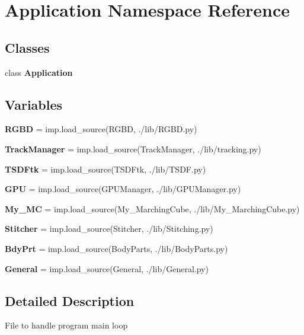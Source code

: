 \section{Application Namespace Reference}
\label{namespace_application}
\subsection*{Classes}
\begin{DoxyCompactItemize}
\item 
class \textbf{ Application}
\end{DoxyCompactItemize}
\subsection*{Variables}
\begin{DoxyCompactItemize}
\item 
\mbox{\label{namespace_application_a2fbdda0410c38b56264f744c6908835f}} 
{\bfseries R\+G\+BD} = imp.\+load\+\_\+source(\textquotesingle{}R\+G\+BD\textquotesingle{}, \textquotesingle{}./lib/R\+G\+B\+D.\+py\textquotesingle{})
\item 
\mbox{\label{namespace_application_a504993c7a678a17fdbb69a96ad9fef6a}} 
{\bfseries Track\+Manager} = imp.\+load\+\_\+source(\textquotesingle{}Track\+Manager\textquotesingle{}, \textquotesingle{}./lib/tracking.\+py\textquotesingle{})
\item 
\mbox{\label{namespace_application_abfb5c07a5ff0183031a6bfbd0993b799}} 
{\bfseries T\+S\+D\+Ftk} = imp.\+load\+\_\+source(\textquotesingle{}T\+S\+D\+Ftk\textquotesingle{}, \textquotesingle{}./lib/T\+S\+D\+F.\+py\textquotesingle{})
\item 
\mbox{\label{namespace_application_ac45436a85e7dd911ff145a77e6351ef7}} 
{\bfseries G\+PU} = imp.\+load\+\_\+source(\textquotesingle{}G\+P\+U\+Manager\textquotesingle{}, \textquotesingle{}./lib/G\+P\+U\+Manager.\+py\textquotesingle{})
\item 
\mbox{\label{namespace_application_a47a0bc7f73457e9921c018340281cda4}} 
{\bfseries My\+\_\+\+MC} = imp.\+load\+\_\+source(\textquotesingle{}My\+\_\+\+Marching\+Cube\textquotesingle{}, \textquotesingle{}./lib/My\+\_\+\+Marching\+Cube.\+py\textquotesingle{})
\item 
\mbox{\label{namespace_application_a4018729b4cf7db423a9d89e4346c7b92}} 
{\bfseries Stitcher} = imp.\+load\+\_\+source(\textquotesingle{}Stitcher\textquotesingle{}, \textquotesingle{}./lib/Stitching.\+py\textquotesingle{})
\item 
\mbox{\label{namespace_application_aeb29430194fcd06cda11b9f56fb432cd}} 
{\bfseries Bdy\+Prt} = imp.\+load\+\_\+source(\textquotesingle{}Body\+Parts\textquotesingle{}, \textquotesingle{}./lib/Body\+Parts.\+py\textquotesingle{})
\item 
\mbox{\label{namespace_application_a6f9414b74b3dea7e1b3ede67f9ff5d0b}} 
{\bfseries General} = imp.\+load\+\_\+source(\textquotesingle{}General\textquotesingle{}, \textquotesingle{}./lib/General.\+py\textquotesingle{})
\end{DoxyCompactItemize}


\subsection{Detailed Description}
\begin{DoxyVerb}File to handle program main loop
\end{DoxyVerb}
 
